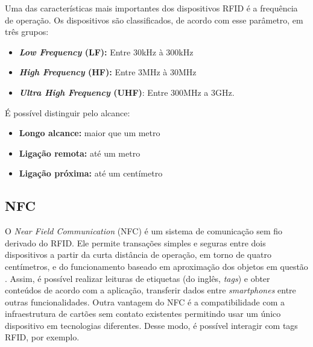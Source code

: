 

Uma das características mais importantes dos dispositivos RFID é a frequência de operação.
Os dispositivos são classificados, de acordo com esse parâmetro, em três grupos:

\begin{itemize}[noitemsep,topsep=2pt]
	\item \textbf{\textit{Low Frequency} (LF):} Entre 30kHz à 300kHz
	\item \textbf{\textit{High Frequency} (HF):} Entre 3MHz à 30MHz
	\item \textbf{\textit{Ultra High Frequency} (UHF)}: Entre 300MHz a 3GHz.
\end{itemize}

É possível distinguir pelo alcance:

\begin{itemize}[topsep=3pt, noitemsep]  
	\item \textbf{Longo alcance:} maior que um metro
	\item \textbf{Ligação remota:} até um metro
	\item \textbf{Ligação próxima:} até um centímetro
\end{itemize}


\subsection{NFC}

O \textit{\textit{Near Field Communication}} (NFC) é um sistema de comunicação sem fio derivado do RFID. Ele permite transações simples e seguras entre dois dispositivos a partir da curta distância de operação, em torno de quatro centímetros, e do funcionamento baseado em aproximação dos objetos em questão \cite{NFCForum2016}. 
Assim, é possível realizar leituras de etiquetas (do inglês, \textit{tags}) e obter conteúdos de acordo com a aplicação, transferir dados entre \textit{smartphones} entre outras funcionalidades.
Outra vantagem do NFC é a compatibilidade com a infraestrutura de cartões sem contato existentes permitindo usar um único dispositivo em tecnologias diferentes. Desse modo, é possível interagir com tags RFID, por exemplo.


